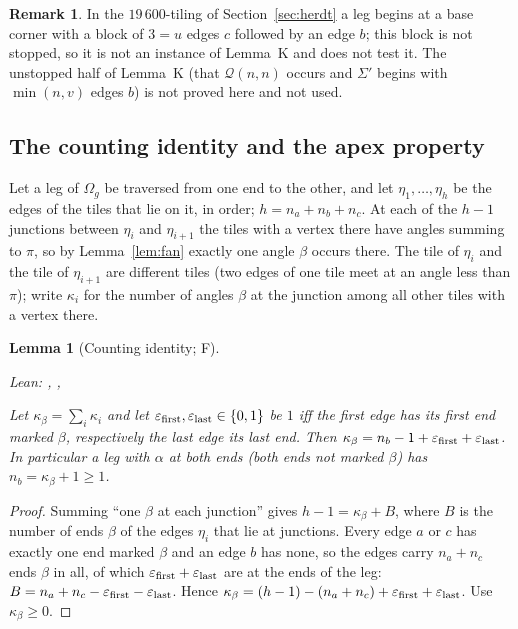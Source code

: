 \documentclass[11pt,reqno]{amsart}
\theoremstyle{plain}
\newtheorem{lemma}[theorem]{Lemma}
\theoremstyle{definition}
\newtheorem{remark}[theorem]{Remark}
\newcommand{\sF}{\textup{\textsf{F}}}
\begin{document}
\begin{remark}
In the $19\,600$-tiling of Section~\ref{sec:herdt} a leg begins at a base corner with a block of $3=u$ edges $c$ followed by an edge $b$; this block is not stopped, so it is not an instance of Lemma~K and does not test it. The unstopped half of Lemma~K (that $\mathcal Q(n,n)$ occurs and $\Sigma'$ begins with $\min(n,v)$ edges $b$) is not proved here and not used.
\end{remark}

\subsection{The counting identity and the apex property}\label{sub:counting}
Let a leg of $\Omega_{g}$ be traversed from one end to the other, and let $\eta_1,\dots,\eta_h$ be the edges of the tiles that lie on it, in order; $h=n_a+n_b+n_c$. At each of the $h-1$ junctions between $\eta_i$ and $\eta_{i+1}$ the tiles with a vertex there have angles summing to $\pi$, so by Lemma~\ref{lem:fan} exactly one angle $\beta$ occurs there. The tile of $\eta_i$ and the tile of $\eta_{i+1}$ are different tiles (two edges of one tile meet at an angle less than $\pi$); write $\kappa_i$ for the number of angles $\beta$ at the junction among all other tiles with a vertex there.
\begin{lemma}[Counting identity; \sF]\label{lem:counting}
{\small\noindent\emph{Lean:} , , \par}
Let $\kappa_\beta=\sum_i\kappa_i$ and let $\varepsilon_{\rm first},\varepsilon_{\rm last}\in\{0,1\}$ be $1$ iff the first edge has its first end marked $\beta$, respectively the last edge its last end. Then $\kappa_\beta=n_b-1+\varepsilon_{\rm first}+\varepsilon_{\rm last}$. In particular a leg with $\alpha$ at both ends (both ends not marked $\beta$) has $n_b=\kappa_\beta+1\ge1$.
\end{lemma}
\begin{proof}
Summing ``one $\beta$ at each junction'' gives $h-1=\kappa_\beta+B$, where $B$ is the number of ends $\beta$ of the edges $\eta_i$ that lie at junctions. Every edge $a$ or $c$ has exactly one end marked $\beta$ and an edge $b$ has none, so the edges carry $n_a+n_c$ ends $\beta$ in all, of which $\varepsilon_{\rm first}+\varepsilon_{\rm last}$ are at the ends of the leg: $B=n_a+n_c-\varepsilon_{\rm first}-\varepsilon_{\rm last}$. Hence $\kappa_\beta=(h-1)-(n_a+n_c)+\varepsilon_{\rm first}+\varepsilon_{\rm last}$. Use $\kappa_\beta\ge0$.
\end{proof}
\end{document}
